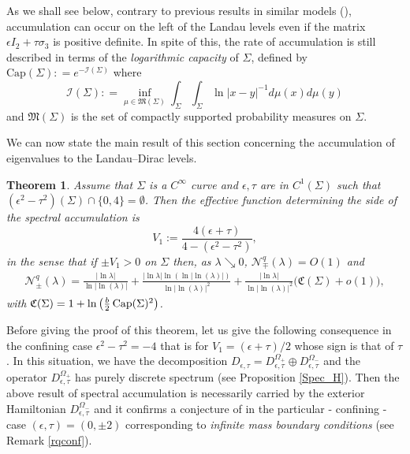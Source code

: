 \documentclass[11pt,a4paper,reqno,oneside]{amsproc}
\newcommand{\capa}{{\textrm{Cap}}}
\newcommand{\gM}{{\mathfrak{M}}}
\numberwithin{equation}{section}
\newtheorem{theorem}[definition]{Theorem}
\begin{document}
As we shall see below, contrary to previous results in similar models (\cite{ RaWa02, FiPu06, MeRo07, PushRoz07,  RoTa08, Pe09, PuRo11, GoKaPe16, BHOP20, BM}), accumulation can occur on  the left of the Landau levels even if the matrix $\epsilon I_2 + \tau \sigma_3$ is positive definite.
 In spite of this, the rate of accumulation is still described in terms of the {\em logarithmic capacity} of $\Sigma$, defined by $\capa(\Sigma) : = e^{-{\mathcal I}(\Sigma)}$ where
\[
{\mathcal I}(\Sigma) : = \inf_{\mu \in \gM(\Sigma)}  \int_{\Sigma} \int_{\Sigma} \ln{|x-y|^{-1}} d\mu(x) d\mu(y)
\]    
and $\mathfrak{M}(\Sigma)$ is the set of compactly supported probability measures on $\Sigma$.


We can now state the main result of this section concerning the accumulation of eigenvalues to the Landau--Dirac levels. 
\begin{theorem}\label{Cluster}
Assume that $\Sigma $ is a $C^\infty$ curve and   $\epsilon,\tau$ are in $C^1(\Sigma)$ such that $(\epsilon^2-\tau^2)(\Sigma) \cap \{0,4\} = \emptyset$. 
Then the effective function determining the side of the spectral accumulation is 
\[
V_1:=\frac{4(\epsilon+\tau)}{4-(\epsilon^2-\tau^2)},
\]
in the sense that if $\pm V_1 >0$ on $\Sigma$ then, as $\lambda \searrow 0$, ${\mathcal N}_{\mp}^q(\lambda)= O(1)$ and 
\begin{align}\label{Asymp}
 {\mathcal N}_{\pm}^q(\lambda)=\frac{|\ln{\lambda}|}{\ln|\ln(\lambda)|} + \frac{|\ln{\lambda}|\ln(\ln|\ln(\lambda)|)}{\ln|\ln(\lambda)|^2}  +   \frac{|\ln{\lambda}|}{\ln|\ln(\lambda)|^2}\big(\mathfrak C(\Sigma)+o(1)\big),
\end{align}
 with $\mathfrak C(\Sigma)  = 1+  \ln{\left(\frac{b}2\,{\rm Cap}(\Sigma)^2\right)}$.
\end{theorem} 

Before  giving the proof of this theorem, let us give the following consequence in the confining case $\epsilon^2-\tau^2=-4$ that is for $V_1=(\epsilon+\tau)/2$ whose sign is that of $\tau$. In this situation, we have the decomposition $D_{\epsilon, \tau}=D_{\epsilon,\tau}^{\Omega_+}\oplus D_{\epsilon,\tau}^{\Omega_-}$ and the operator $D_{\epsilon,\tau}^{\Omega_+}$ has purely discrete spectrum (see Proposition \ref{Spec_H}). Then the above result of spectral accumulation is necessarily carried by the exterior Hamiltonian $D_{\epsilon,\tau}^{\Omega_-}$ and it confirms a conjecture of \cite{BM} 
in the particular - confining - case $(\epsilon, \tau)=(0, \pm 2)$ corresponding to  \textit{infinite mass boundary conditions} (see Remark \ref{rqconf}).
\end{document}
